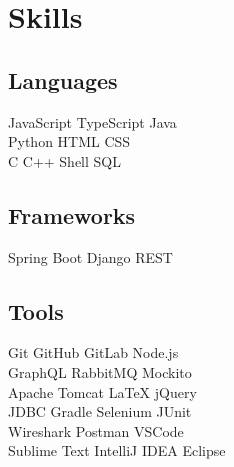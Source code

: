 \documentclass[]{deedy-resume-openfont}
\begin{document}
%
%
\lastupdated

%
%

%
%

\begin{minipage}[t]{0.33\textwidth} 


\section{Skills}
\subsection{Languages}
JavaScript \textbullet{} TypeScript \textbullet Java \\ 
\textbullet{} Python \textbullet{} HTML \textbullet{} CSS \\ 
\textbullet{} C \textbullet{} C++ \textbullet{} Shell \textbullet{} SQL \\

\subsection{Frameworks}
Spring Boot \textbullet{} Django REST\\

\subsection{Tools}
Git \textbullet{} GitHub  \textbullet{} GitLab  \textbullet{} Node.js \\
\textbullet{} GraphQL \textbullet{} RabbitMQ \textbullet{} Mockito\\
\textbullet{} Apache Tomcat \textbullet{} LaTeX \textbullet{} jQuery \\
\textbullet{} JDBC \textbullet{} Gradle \textbullet{} Selenium \textbullet{} JUnit  \\ 
\textbullet{} Wireshark \textbullet{} Postman \textbullet{} VSCode \\
\textbullet{} Sublime Text \textbullet{} IntelliJ IDEA \textbullet{} Eclipse 
\sectionsep


\end{minipage}
\end{document}
